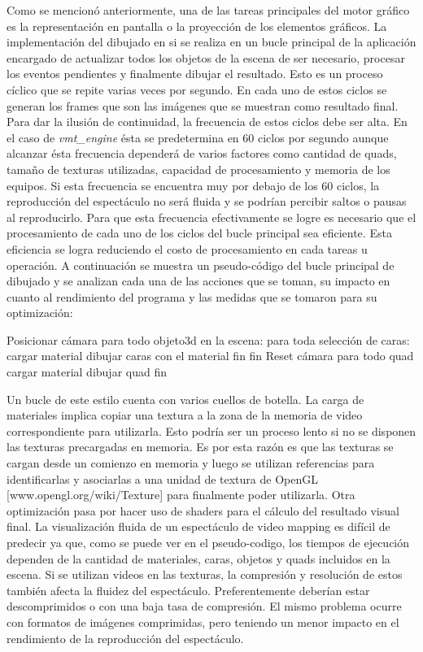 Como se mencionó anteriormente, una de las tareas principales del motor gráfico es la representación en pantalla o la proyección de los elementos gráficos. La implementación del dibujado en si se realiza en un bucle principal de la aplicación encargado de actualizar todos los objetos de la escena de ser necesario, procesar los eventos pendientes y finalmente dibujar el resultado. Esto es un proceso cíclico que se repite varias veces por segundo.
En cada uno de estos ciclos se generan los frames que son las imágenes que se muestran como resultado final.
Para dar la ilusión de continuidad, la frecuencia de estos ciclos debe ser alta. En el caso de \emph{vmt\_engine} ésta se predetermina en 60 ciclos por segundo aunque alcanzar ésta frecuencia dependerá de varios factores como cantidad de quads, tamaño de texturas utilizadas, capacidad de procesamiento y memoria de los equipos.
Si esta frecuencia se encuentra muy por debajo de los 60 ciclos, la reproducción del espectáculo no será fluida y se podrían percibir saltos o pausas al reproducirlo.
Para que esta frecuencia efectivamente se logre es necesario que el procesamiento de cada uno de los ciclos del bucle principal sea eficiente. Esta eficiencia se logra reduciendo el costo de procesamiento en cada tareas u operación. A continuación se muestra un pseudo-código del bucle principal de dibujado y se analizan cada una de las acciones que se toman, su impacto en cuanto al rendimiento del programa y las medidas que se tomaron para su optimización:

Posicionar cámara
para todo objeto3d en la escena:
   para toda selección de caras:
       cargar material
       dibujar caras con el material
   fin
fin
Reset cámara
para todo quad
   cargar material
   dibujar quad
fin

Un bucle de este estilo cuenta con varios cuellos de botella.
La carga de materiales implica copiar una textura a la zona de la memoria de video correspondiente para utilizarla. Esto podría ser un proceso lento si no se disponen las texturas precargadas en memoria. Es por esta razón es que las texturas se cargan desde un comienzo en memoria y luego se utilizan referencias para identificarlas y asociarlas a una unidad de textura de OpenGL [www.opengl.org/wiki/Texture] para finalmente poder utilizarla.
Otra optimización pasa por hacer uso de shaders para el cálculo del resultado visual final.
La visualización fluida de un espectáculo de video mapping es difícil de predecir ya que, como se puede ver en el pseudo-codigo, los tiempos de ejecución dependen de la cantidad de materiales, caras, objetos y quads incluidos en la escena.
Si se utilizan videos en las texturas, la compresión y resolución de estos también afecta la fluidez del espectáculo. Preferentemente deberían estar descomprimidos o con una baja tasa de compresión. El mismo problema ocurre con formatos de imágenes comprimidas, pero teniendo un menor impacto en el rendimiento de la reproducción del espectáculo.

